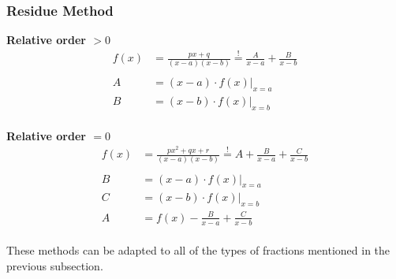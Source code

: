\subsubsection{Residue Method}
\textbf{Relative order $>0$}
\begin{align*}
    f(x) & =\frac{px+q}{(x-a)(x-b)} \overset{!}{=} \frac{A}{x-a}+\frac{B}{x-b} \\\\
    A    & =(x-a)\cdot f(x)\Big|_{x=a}                                         \\
    B    & =(x-b)\cdot f(x)\Big|_{x=b}
\end{align*}\\
\textbf{Relative order $=0$}
\begin{align*}
    f(x) & =\frac{px^2+qx+r}{(x-a)(x-b)} \overset{!}{=} A+\frac{B}{x-a}+\frac{C}{x-b} \\\\
    B    & =(x-a)\cdot f(x)\Big|_{x=a}                                                \\
    C    & =(x-b)\cdot f(x)\Big|_{x=b}                                                \\
    A    & = f(x)-\frac{B}{x-a}+\frac{C}{x-b}
\end{align*}\\
These methods can be adapted to all of the types of fractions mentioned in the previous subsection.
